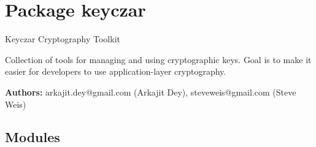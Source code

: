 %
%
%


\section{Package keyczar}

    \label{keyczar}
Keyczar Cryptography Toolkit

Collection of tools for managing and using cryptographic keys. Goal is to 
make it easier for developers to use application-layer cryptography.

\textbf{Authors:}
arkajit.dey@gmail.com (Arkajit Dey),
    steveweis@gmail.com (Steve Weis)



\subsection{Modules}

